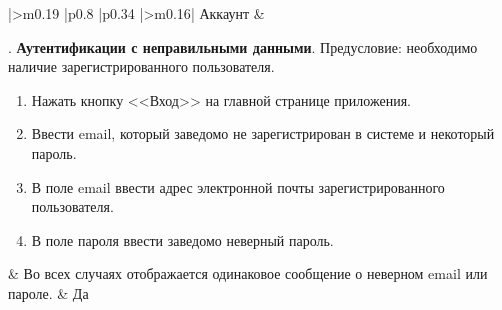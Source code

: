 \begin{landscape}
\begin{longtable}{|>{\centering}m{0.19\textwidth}
					  |p{0.8\textwidth}
					  |p{0.34\textwidth}
					  |>{\centering\arraybackslash}m{0.16\textwidth}|}
	Аккаунт &
	\begin{minipage}[t]{1\linewidth}
		\testnumber. \textbf{Аутентификации с неправильными данными}.\newline
		Предусловие: необходимо наличие зарегистрированного пользователя.
		\begin{enumerate}
			\item Нажать кнопку <<Вход>> на главной странице приложения.
			\item Ввести email, который заведомо не зарегистрирован в системе и некоторый пароль.
			\item В поле email ввести адрес электронной почты зарегистрированного пользователя.
			\item В поле пароля ввести заведомо неверный пароль.
		\end{enumerate}
 	\end{minipage} &
	Во всех случаях отображается одинаковое сообщение о неверном email или пароле. & Да \\



\end{longtable}
\end{landscape}
